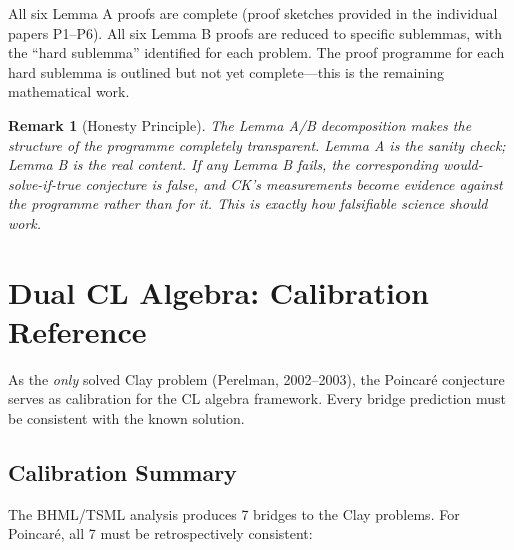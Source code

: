 \documentclass[11pt]{article}
\newtheorem{remark}[theorem]{Remark}
\begin{document}
\noindent All six Lemma A proofs are complete (proof sketches provided in the individual papers P1--P6). All six Lemma B proofs are reduced to specific sublemmas, with the ``hard sublemma'' identified for each problem. The proof programme for each hard sublemma is outlined but not yet complete---this is the remaining mathematical work.

\begin{remark}[Honesty Principle]
The Lemma A/B decomposition makes the structure of the programme completely transparent. Lemma A is the sanity check; Lemma B is the real content. If any Lemma B fails, the corresponding would-solve-if-true conjecture is false, and CK's measurements become evidence \emph{against} the programme rather than for it. This is exactly how falsifiable science should work.
\end{remark}

\section{Dual CL Algebra: Calibration Reference}
\label{sec:calibration}

As the \emph{only} solved Clay problem (Perelman, 2002--2003), the Poincar\'e conjecture serves as calibration for the CL algebra framework. Every bridge prediction must be consistent with the known solution.

\subsection{Calibration Summary}
\label{subsec:calibration-summary}

The BHML/TSML analysis produces 7 bridges to the Clay problems. For Poincar\'e, all 7 must be retrospectively consistent:
\end{document}
